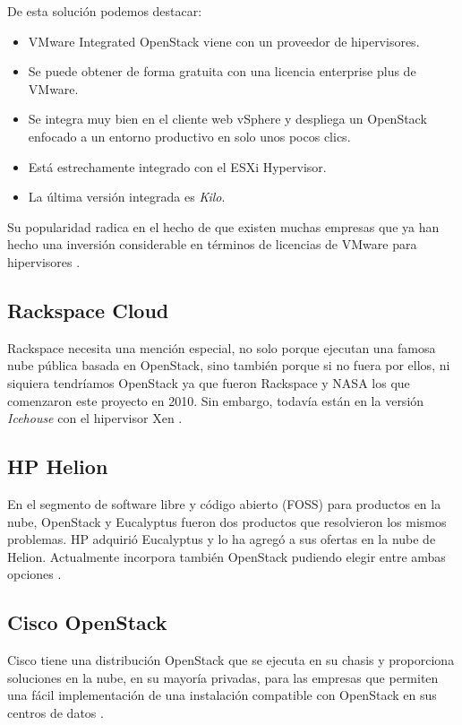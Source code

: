 De esta solución podemos destacar:

\begin{itemize}
\item VMware Integrated OpenStack viene con un proveedor de hipervisores. 
\item Se  puede obtener de forma gratuita con una licencia enterprise plus de VMware.
\item Se integra muy bien en el cliente web vSphere y despliega un OpenStack enfocado a un entorno productivo en solo unos pocos clics.
\item Está estrechamente integrado con el ESXi Hypervisor. 
\item La última versión integrada es \textit{Kilo}.
\end{itemize}


Su popularidad radica en el hecho de que existen muchas empresas que ya han hecho una inversión considerable en términos de licencias de VMware para hipervisores \cite{noauthor_integrated_nodate}.

\subsection{Rackspace Cloud}
Rackspace necesita una mención especial, no solo porque ejecutan una famosa nube pública basada en OpenStack, sino también porque si no fuera por ellos, ni siquiera tendríamos OpenStack ya que fueron Rackspace y NASA los que comenzaron este proyecto en 2010. Sin embargo, todavía están en la versión \textit{Icehouse} con el hipervisor Xen \cite{noauthor_choosing_nodate}.

\subsection{HP Helion}
En el segmento de software libre y  código abierto (FOSS) para productos en la nube, OpenStack y Eucalyptus fueron dos productos que resolvieron los mismos problemas. HP adquirió Eucalyptus y lo ha agregó a sus ofertas en la nube de Helion. Actualmente incorpora también OpenStack pudiendo elegir entre ambas opciones \cite{noauthor_software_nodate}.

\subsection{Cisco OpenStack}
Cisco tiene una distribución OpenStack que se ejecuta en su chasis y proporciona soluciones en la nube, en su mayoría privadas, para las empresas que permiten una fácil implementación de una instalación compatible con OpenStack en sus centros de datos \cite{noauthor_cisco_nodate}.

